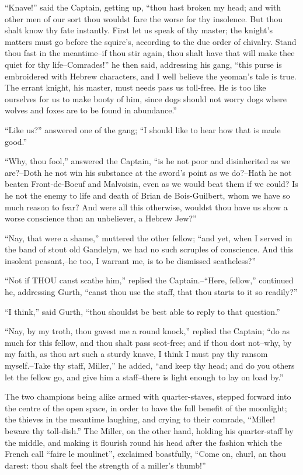 ``Knave!'' said the Captain, getting up, ``thou hast broken my head; and
with other men of our sort thou wouldst fare the worse for thy
insolence. But thou shalt know thy fate instantly. First let us speak of
thy master; the knight's matters must go before the squire's, according
to the due order of chivalry. Stand thou fast in the meantime--if thou
stir again, thou shalt have that will make thee quiet for thy
life--Comrades!'' he then said, addressing his gang, ``this purse is
embroidered with Hebrew characters, and I well believe the yeoman's tale
is true. The errant knight, his master, must needs pass us toll-free. He
is too like ourselves for us to make booty of him, since dogs should not
worry dogs where wolves and foxes are to be found in abundance.''

``Like us?'' answered one of the gang; ``I should like to hear how that
is made good.''

``Why, thou fool,'' answered the Captain, ``is he not poor and
disinherited as we are?--Doth he not win his substance at the sword's
point as we do?--Hath he not beaten Front-de-Boeuf and Malvoisin, even
as we would beat them if we could? Is he not the enemy to life and death
of Brian de Bois-Guilbert, whom we have so much reason to fear? And were
all this otherwise, wouldst thou have us show a worse conscience than an
unbeliever, a Hebrew Jew?''

``Nay, that were a shame,'' muttered the other fellow; ``and yet, when I
served in the band of stout old Gandelyn, we had no such scruples of
conscience. And this insolent peasant,--he too, I warrant me, is to be
dismissed scatheless?''

``Not if THOU canst scathe him,'' replied the Captain.--``Here,
fellow,'' continued he, addressing Gurth, ``canst thou use the staff,
that thou starts to it so readily?''

``I think,'' said Gurth, ``thou shouldst be best able to reply to that
question.''

``Nay, by my troth, thou gavest me a round knock,'' replied the Captain;
``do as much for this fellow, and thou shalt pass scot-free; and if thou
dost not--why, by my faith, as thou art such a sturdy knave, I think I
must pay thy ransom myself.--Take thy staff, Miller,'' he added, ``and
keep thy head; and do you others let the fellow go, and give him a
staff--there is light enough to lay on load by.''

The two champions being alike armed with quarter-staves, stepped forward
into the centre of the open space, in order to have the full benefit of
the moonlight; the thieves in the meantime laughing, and crying to their
comrade, ``Miller! beware thy toll-dish.'' The Miller, on the other
hand, holding his quarter-staff by the middle, and making it flourish
round his head after the fashion which the French call ``faire le
moulinet'', exclaimed boastfully, ``Come on, churl, an thou darest: thou
shalt feel the strength of a miller's thumb!''

